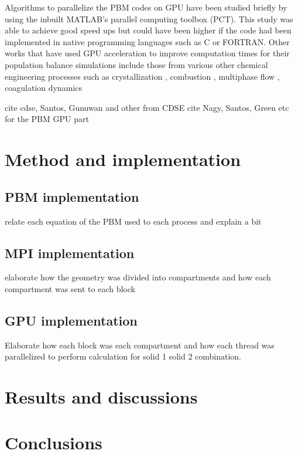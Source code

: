 \documentclass[preprint,10pt,authoryear]{elsarticle}
\begin{document}
\begin{linenumbers}
Algorithms to parallelize the PBM codes on GPU have been studied briefly by \cite{Prakash2013b} 
using the inbuilt MATLAB's parallel computing toolbox (PCT). This study was able to achieve 
good speed ups but could have been higher if the code had been implemented in native programming 
languages such as C or FORTRAN. Other works that have used GPU acceleration to improve computation 
times for their population balance simulations include those from various other chemical engineering 
processes such as crystallization \citep{Szilagy2016}, combustion \citep{Shi2012}, multiphase flow 
\citep{santos2013}, coagulation dynamics \citep{Xu2015}


cite cdse, Santos, Gunuwan and other from CDSE
cite Nagy, Santos, Green etc for the PBM GPU part

\section{Method and implementation}
\label{secMethods}
\subsection{PBM implementation}
relate each equation of the PBM used to each process and explain a bit
\subsection{MPI implementation}
elaborate how the geometry was divided into compartments and how each \\
compartment was sent to each block
\subsection{GPU implementation}
Elaborate how each block was each compartment and how each thread was 
parallelized to perform calculation for solid 1 solid 2 combination.

\section{Results and discussions}
\label{secResults}

\section{Conclusions}
\label{secConc}
\end{linenumbers}



\end{document}
